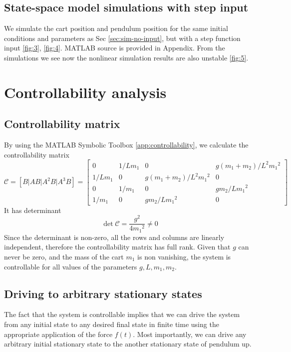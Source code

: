 \documentclass[12pt]{article}
\numberwithin{equation}{section}
\newcommand{\cC}{\mathcal{C}}
\begin{document}
\subsection{State-space model simulations with step input}
We simulate the cart position and pendulum position for the same initial conditions and parameters as Sec \ref{sec:sim-no-input}, but with a step function input \ref{fig:3}, \ref{fig:4}. MATLAB source is provided in Appendix. From the simulations we see now the nonlinear simulation results are also unstable \ref{fig:5}. 

\section{Controllability analysis}

\subsection{Controllability matrix}

By using the MATLAB Symbolic Toolbox \ref{app:controllability}, we calculate the controllability matrix
\begin{equation}
    \cC = \left[B | AB | A^2B | A^3B\right]
    =
    \begin{bmatrix}
    0 & 1/L m_1 & 0 & g (m_1 + m_2)/L^2 {m_1}^2\\
    1/L m_1 & 0 & g (m_1 + m_2)/L^2 {m_1}^2 & 0\\
    0 & 1/m_1 & 0 & g m_2/L {m_1}^2\\
    1/m_1 & 0 &  g m_2/L{m_1}^2 & 0
    \end{bmatrix}
\end{equation}
It has determinant
\begin{equation}
    \det\cC = \frac{g^2}{4 {m_1}^2} \neq 0
\end{equation}
Since the determinant is non-zero, all the rows and columns are linearly independent, therefore the controllability matrix has full rank. Given that $g$ can never be zero, and the mass of the cart $m_1$ is non vanishing, the system is controllable for all values of the parameters $g,L,m_1,m_2$.

\subsection{Driving to arbitrary stationary states}

The fact that the system is controllable implies that we can drive the system from any initial state to any desired final state in finite time using the appropriate application of the force $f(t)$. Most importantly, we can drive any arbitrary initial stationary state to the another stationary state of pendulum up.
\end{document}
